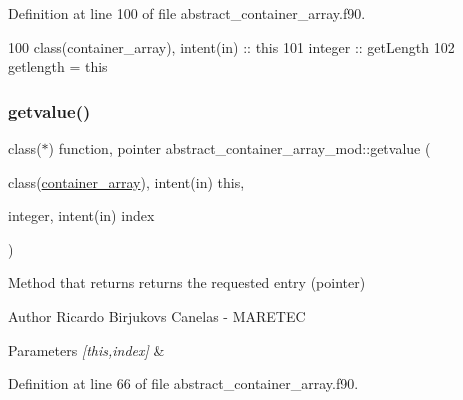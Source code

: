 Definition at line 100 of file abstract\+\_\+container\+\_\+array.\+f90.


\begin{DoxyCode}
100     \textcolor{keywordtype}{class}(container\_array), \textcolor{keywordtype}{intent(in)} :: this
101     \textcolor{keywordtype}{integer} :: getLength
102     getlength = this%
\end{DoxyCode}
\mbox{\label{namespaceabstract__container__array__mod_a2b3e0aec504d76c73bf7f18158924af4}} 
\subsubsection{\texorpdfstring{getvalue()}{getvalue()}}
{\footnotesize\ttfamily class($\ast$) function, pointer abstract\+\_\+container\+\_\+array\+\_\+mod\+::getvalue (\begin{DoxyParamCaption}\item[{class(\mbox{\hyperlink{structabstract__container__array__mod_1_1container__array}{container\+\_\+array}}), intent(in)}]{this,  }\item[{integer, intent(in)}]{index }\end{DoxyParamCaption})\hspace{0.3cm}{\ttfamily [private]}}



Method that returns returns the requested entry (pointer) 

\begin{DoxyAuthor}{Author}
Ricardo Birjukovs Canelas -\/ M\+A\+R\+E\+T\+EC 
\end{DoxyAuthor}

\begin{DoxyParams}{Parameters}
{\em \mbox{[}this,index\mbox{]}} & \\
\hline
\end{DoxyParams}


Definition at line 66 of file abstract\+\_\+container\+\_\+array.\+f90.


